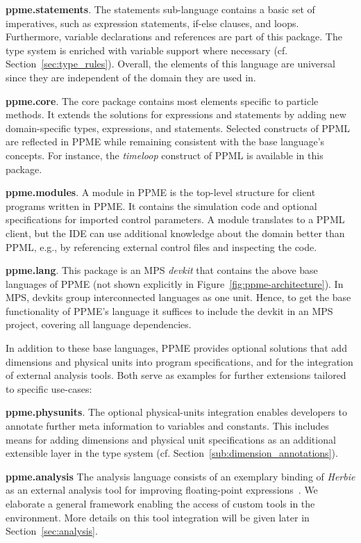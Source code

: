 \textbf{ppme.statements}.
The statements sub-language contains a basic set of imperatives, such as expression statements, if-else clauses, and loops.
Furthermore, variable declarations and references are part of this package.
The type system is enriched with variable support where necessary (cf. Section~\ref{sec:type_rules}).
Overall, the elements of this language are universal since they are independent of the domain they are used in.

\textbf{ppme.core}.
The core package contains most elements specific to particle methods.
It extends the solutions for expressions and statements by adding new domain-specific types, expressions, and statements.
Selected constructs of PPML are reflected in PPME while remaining consistent with the base language's concepts.
For instance, the \emph{timeloop} construct of PPML is available in this package.

\textbf{ppme.modules}.
A module in PPME is the top-level structure for client programs written in PPME. It contains the simulation code
and optional specifications for imported control parameters. A module translates to a PPML client, but the
IDE can use additional knowledge about the domain better than PPML, e.g., by referencing external control
files and inspecting the code.

\textbf{ppme.lang}.
This package is an MPS \emph{devkit} that contains the above base languages of PPME (not shown explicitly in Figure~\ref{fig:ppme-architecture}).
In MPS, devkits group interconnected languages as one unit. Hence, to get the base functionality of
PPME's language it suffices to include the devkit in an MPS project, covering all language dependencies.

In addition to these base languages, PPME provides optional solutions that add dimensions and physical units into program specifications,
and for the integration of external analysis tools. Both serve as examples for further extensions
tailored to specific use-cases:

\textbf{ppme.physunits}.
The optional physical-units integration enables developers to annotate further meta information to variables and constants.
This includes means for adding dimensions and physical unit specifications as an additional extensible
layer in the type system (cf. Section~\ref{sub:dimension_annotations}).

\textbf{ppme.analysis}
The analysis language consists of an exemplary binding of \emph{Herbie} as an external analysis tool for improving
floating-point expressions~\cite{Panchekha2015}. We elaborate a general framework enabling the access of custom
 tools in the environment. More details on this tool integration will be given later in Section~\ref{sec:analysis}.

